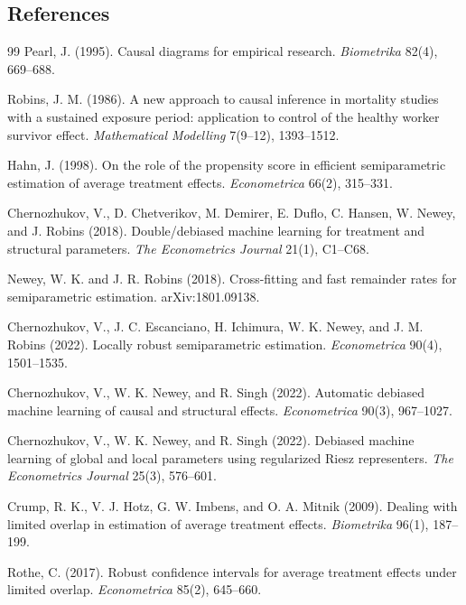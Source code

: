 \documentclass[11pt]{article}
\theoremstyle{definition}
\theoremstyle{plain}
\theoremstyle{remark}
\begin{document}
\subsection*{References}
\begin{thebibliography}{99}
Pearl, J. (1995).
Causal diagrams for empirical research.
\emph{Biometrika} 82(4), 669--688.

Robins, J. M. (1986).
A new approach to causal inference in mortality studies with a sustained
exposure period: application to control of the healthy worker survivor effect.
\emph{Mathematical Modelling} 7(9--12), 1393--1512.

Hahn, J. (1998).
On the role of the propensity score in efficient semiparametric estimation of
average treatment effects.
\emph{Econometrica} 66(2), 315--331.

Chernozhukov, V., D. Chetverikov, M. Demirer, E. Duflo, C. Hansen, W. Newey,
and J. Robins (2018).
Double/debiased machine learning for treatment and structural parameters.
\emph{The Econometrics Journal} 21(1), C1--C68.

Newey, W. K. and J. R. Robins (2018).
Cross-fitting and fast remainder rates for semiparametric estimation.
arXiv:1801.09138.

Chernozhukov, V., J. C. Escanciano, H. Ichimura, W. K. Newey, and
J. M. Robins (2022).
Locally robust semiparametric estimation.
\emph{Econometrica} 90(4), 1501--1535.

Chernozhukov, V., W. K. Newey, and R. Singh (2022).
Automatic debiased machine learning of causal and structural effects.
\emph{Econometrica} 90(3), 967--1027.

Chernozhukov, V., W. K. Newey, and R. Singh (2022).
Debiased machine learning of global and local parameters using regularized
Riesz representers.
\emph{The Econometrics Journal} 25(3), 576--601.

Crump, R. K., V. J. Hotz, G. W. Imbens, and O. A. Mitnik (2009).
Dealing with limited overlap in estimation of average treatment effects.
\emph{Biometrika} 96(1), 187--199.

Rothe, C. (2017).
Robust confidence intervals for average treatment effects under limited
overlap.
\emph{Econometrica} 85(2), 645--660.


\end{thebibliography}
\end{document}
